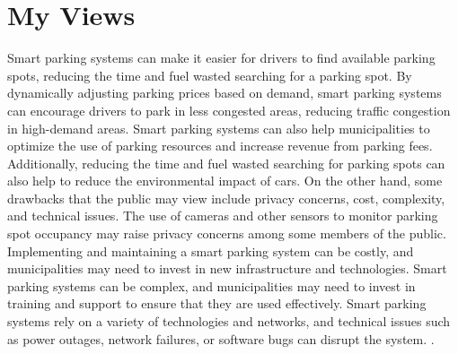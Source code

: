 \documentclass[12pt]{article}
\begin{document}
\section{My Views}
	Smart parking systems can make it easier for drivers to find available parking spots, reducing the time and fuel wasted searching for a parking spot. By dynamically adjusting parking prices based on demand, smart parking systems can encourage drivers to park in less congested areas, reducing traffic congestion in high-demand areas. Smart parking systems can also help municipalities to optimize the use of parking resources and increase revenue from parking fees. Additionally, reducing the time and fuel wasted searching for parking spots can also help to reduce the environmental impact of cars. On the other hand, some drawbacks that the public may view include privacy concerns, cost, complexity, and technical issues. The use of cameras and other sensors to monitor parking spot occupancy may raise privacy concerns among some members of the public. Implementing and maintaining a smart parking system can be costly, and municipalities may need to invest in new infrastructure and technologies. Smart parking systems can be complex, and municipalities may need to invest in training and support to ensure that they are used effectively. Smart parking systems rely on a variety of technologies and networks, and technical issues such as power outages, network failures, or software bugs can disrupt the system.  .
\end{document}
